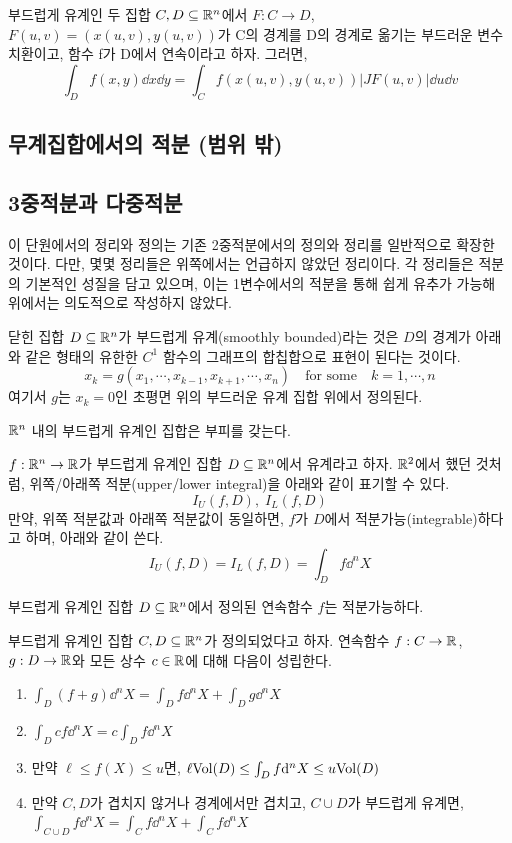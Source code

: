 \begin{theorem}
부드럽게 유계인 두 집합 $C, D\subseteq\mathbb{R}^n$에서 $F:C\to D$, $F(u,v)=(x(u,v),y(u,v))$가 C의 경계를 D의 경계로 옮기는 부드러운 변수치환이고, 함수 f가 D에서 연속이라고 하자. 그러면,
$$
\int_Df(x,y)\dd x\dd y=\int_Cf(x(u,v),y(u,v))|JF(u,v)|\dd u\dd v
$$
\end{theorem}

\subsection{무계집합에서의 적분 (범위 밖)}

\subsection{3중적분과 다중적분}
이 단원에서의 정리와 정의는 기존 2중적분에서의 정의와 정리를 일반적으로 확장한 것이다. 다만, 몇몇 정리들은 위쪽에서는 언급하지 않았던 정리이다. 각 정리들은 적분의 기본적인 성질을 담고 있으며, 이는 1변수에서의 적분을 통해 쉽게 유추가 가능해 위에서는 의도적으로 작성하지 않았다.
\begin{definition}[$\R^n$에서 부드러운 유계]
닫힌 집합 $D\subseteq\mathbb{R}^n$가 부드럽게 유계(smoothly bounded)라는 것은 $D$의 경계가 아래와 같은 형태의 유한한 $C^1$ 함수의 그래프의 합칩합으로 표현이 된다는 것이다.
$$
x_k=g(x_1,\cdots,x_{k-1},x_{k+1},\cdots,x_n)\quad\text{for some}\quad k=1,\cdots,n
$$
여기서 $g$는 $x_k=0$인 초평면 위의 부드러운 유계 집합 위에서 정의된다.
\end{definition}
\begin{theorem}
$\R^n$ 내의 부드럽게 유계인 집합은 부피를 갖는다.
\end{theorem}
\begin{definition}[$\R^n$에서 위쪽/아래쪽 적분]
$f: \mathbb{R}^n \to \mathbb{R}$가 부드럽게 유계인 집합 $D\subseteq\mathbb{R}^n$에서 유계라고 하자. $\mathbb{R}^2$에서 했던 것처럼, 위쪽/아래쪽 적분(upper/lower integral)을 아래와 같이 표기할 수 있다.
$$I_U(f,D),\;I_L(f,D)$$
만약, 위쪽 적분값과 아래쪽 적분값이 동일하면, $f$가 $D$에서 적분가능(integrable)하다고 하며, 아래와 같이 쓴다.
$$
I_U(f,D)=I_L(f,D)=\int_D f\dd^nX
$$
\end{definition}
\begin{theorem}
부드럽게 유계인 집합 $D\subseteq\mathbb{R}^n$에서 정의된 연속함수 $f$는 적분가능하다.
\end{theorem}
\begin{theorem}
부드럽게 유계인 집합 $C,D\subseteq\mathbb{R}^n$가 정의되었다고 하자. 연속함수 $f:C\to\mathbb{R}$, $g:D\to\mathbb{R}$와 모든 상수 $c\in\mathbb{R}$에 대해 다음이 성립한다.
\begin{enumerate}[label=(\alph*)]
    \item $\int_D(f+g)\dd^nX=\int_Df\dd^nX+\int_Dg\dd^nX$
    \item $\int_Dcf\dd^nX=c\int_Df\dd^nX$
    \item 만약 $\ell\le f(X)\le u$면, $\ell\mathrm{Vol}(D)\le\int_D f\dd^nX\le u\mathrm{Vol}(D)$
    \item 만약 $C,D$가 겹치지 않거나 경계에서만 겹치고, $C\cup D$가 부드럽게 유계면, $\int_{C\cup D}f\dd^nX=\int_Cf\dd^nX+\int_Cf\dd^nX$
\end{enumerate}
\end{theorem}
